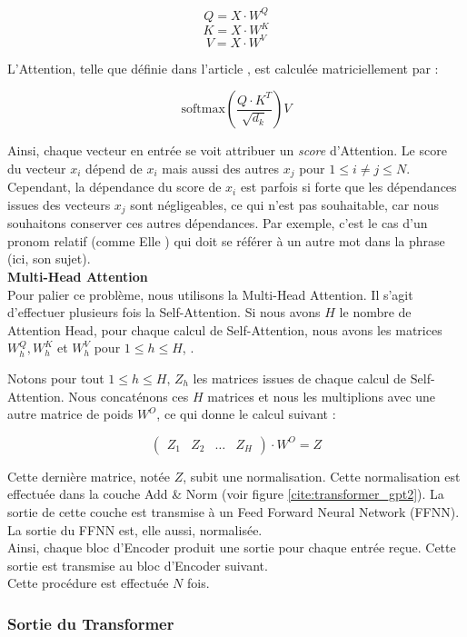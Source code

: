 \[ Q = X \cdot W^Q  \]
\[ K = X \cdot W^K  \]
\[ V = X \cdot W^V  \]

L'Attention, telle que définie dans l'article \cite{vaswani2017attention}, est calculée matriciellement par :

\[ \text{softmax}\left( \frac{Q \cdot K^T}{\sqrt{d_k}} \right) V \]

Ainsi, chaque vecteur en entrée se voit attribuer un \textit{score} d'Attention. Le score du vecteur $x_i$ dépend de $x_i$ mais
aussi des autres $x_j$ pour $1 \leq i \neq j \leq N$. Cependant, la dépendance du score de $x_i$ est parfois si forte que les
dépendances issues des vecteurs $x_j$ sont négligeables, ce qui n'est pas souhaitable, car nous souhaitons
conserver ces autres dépendances. Par exemple, c'est le cas d'un pronom relatif (comme \og Elle \fg{}) qui doit se référer
à un autre mot dans la phrase (ici, son sujet). \\

\textbf{Multi-Head Attention} \\


Pour palier ce problème, nous utilisons la Multi-Head Attention. Il s'agit d'effectuer plusieurs fois la Self-Attention. Si
nous avons $H$ le nombre de Attention Head, pour chaque calcul de Self-Attention, nous avons les matrices
$W_h^Q, W_h^K$ et $W_h^V$ pour $1 \leq h \leq H$, .

Notons pour tout $1 \leq h \leq H, \, Z_h$ les matrices issues de chaque calcul de Self-Attention. Nous concaténons
ces $H$ matrices et nous les multiplions avec une autre matrice de poids $W^O$, ce qui donne le calcul suivant :

\[  \begin{pmatrix}
    Z_1 & Z_2 & \ldots & Z_H
  \end{pmatrix}
  \cdot W^O = Z \]


Cette dernière matrice, notée $Z$, subit une normalisation. Cette normalisation est effectuée dans la
couche \og Add \& Norm \fg{} (voir figure \ref{cite:transformer_gpt2}).
La sortie de cette couche est transmise à un Feed Forward Neural Network (FFNN).
La sortie du FFNN est, elle aussi, normalisée. \\

Ainsi, chaque bloc d'Encoder produit une sortie pour chaque entrée reçue.
Cette sortie est transmise au bloc d'Encoder suivant. \\

Cette procédure est effectuée $N$ fois.


\subsubsection{Sortie du Transformer}



